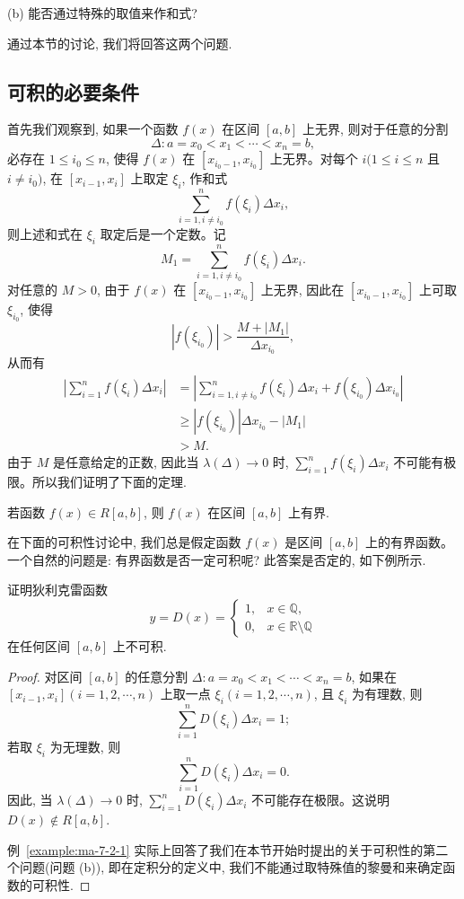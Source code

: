 (b) 能否通过特殊的取值来作和式?

通过本节的讨论, 我们将回答这两个问题.

\subsection{可积的必要条件}
\label{subsec:ma-7-2-1}

首先我们观察到, 如果一个函数 $f(x)$ 在区间 $[a,b]$ 上无界, 则对于任意的分割
\[
  \Delta:a=x_0<x_1<\cdots<x_n=b,
\]
必存在 $1\leq i_0\leq n$, 使得 $f(x)$ 在 $[x_{i_0-1},x_{i_0}]$ 上无界。对每个 $i(1\leq i\leq n$ 且 $i\ne i_0)$, 在 $[x_{i-1},x_i]$ 上取定 $\xi_i$, 作和式
\[
  \sum_{i=1,i\ne i_0}^n f(\xi_i)\Delta x_i,
\]
则上述和式在 $\xi_i$ 取定后是一个定数。记
\[
  M_1=\sum_{i=1,i\ne i_0}^n f(\xi_i)\Delta x_i.
\]
对任意的 $M>0$, 由于 $f(x)$ 在 $[x_{i_0-1},x_{i_0}]$ 上无界, 因此在 $[x_{i_0-1},x_{i_0}]$ 上可取 $\xi_{i_0}$, 使得
\[
  |f(\xi_{i_0})|>\frac{M+|M_1|}{\Delta x_{i_0}},
\]
从而有
\[
\begin{aligned}
  \left|\sum_{i=1}^n f(\xi_i)\Delta x_i\right|
  &=\left|\sum_{i=1,i\ne i_0}^n f(\xi_i)\Delta x_i+f(\xi_{i_0})\Delta x_{i_0}\right|\\
  &\geq |f(\xi_{i_0})|\Delta x_{i_0}-|M_1|\\
  &>M.
\end{aligned}
\]
由于 $M$ 是任意给定的正数, 因此当 $\lambda(\Delta)\to0$ 时, $\sum\limits_{i=1}^n f(\xi_i)\Delta x_i$ 不可能有极限。所以我们证明了下面的定理.

\begin{theorem}\label{theorem:ma-7-2-1}
若函数 $f(x)\in R[a,b]$, 则 $f(x)$ 在区间 $[a,b]$ 上有界.
\end{theorem}

在下面的可积性讨论中, 我们总是假定函数 $f(x)$ 是区间 $[a,b]$ 上的有界函数。一个自然的问题是: 有界函数是否一定可积呢? 此答案是否定的, 如下例所示.

\begin{example}\label{example:ma-7-2-1}
证明狄利克雷函数
\[
  y=D(x)=
  \begin{cases}
    1, & x\in\mathbb Q,\\
    0, & x\in\mathbb R\setminus\mathbb Q
  \end{cases}
\]
在任何区间 $[a,b]$ 上不可积.
\end{example}


\begin{proof}
对区间 $[a,b]$ 的任意分割 $\Delta:a=x_0<x_1<\cdots<x_n=b$, 如果在 $[x_{i-1},x_i](i=1,2,\cdots,n)$ 上取一点 $\xi_i(i=1,2,\cdots,n)$, 且 $\xi_i$ 为有理数, 则
\[
  \sum_{i=1}^n D(\xi_i)\Delta x_i=1;
\]
若取 $\xi_i$ 为无理数, 则
\[
  \sum_{i=1}^n D(\xi_i)\Delta x_i=0.
\]
因此, 当 $\lambda(\Delta)\to0$ 时, $\sum\limits_{i=1}^n D(\xi_i)\Delta x_i$ 不可能存在极限。这说明 $D(x)\notin R[a,b]$.

例~\ref{example:ma-7-2-1} 实际上回答了我们在本节开始时提出的关于可积性的第二个问题(问题 (b)), 即在定积分的定义中, 我们不能通过取特殊值的黎曼和来确定函数的可积性.
\end{proof}


